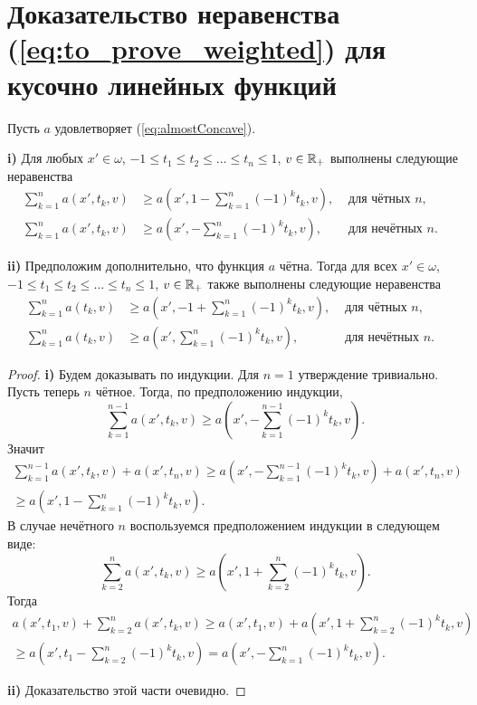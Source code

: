\section{Доказательство неравенства (\ref{eq:to_prove_weighted}) для кусочно ли\-ней\-ных функций}

\begin{lm}
\label{lm:weight_sum}
Пусть $a$ удовлетворяет (\ref{eq:almostConcave}).

\textbf{\textup{i)}}
Для любых $x' \in \omega$, $-1 \le t_1 \le t_2 \le \ldots \le t_n \le 1$, $v \in \mathbb R_+$ выполнены следующие неравенства
\begin{align*}
\sum_{k = 1}^n a(x', t_k, v) & \ge a( x', 1 - \sum_{k = 1}^n (-1)^k t_k, v ), & \text{ для чётных $n$}, & \\
\sum_{k = 1}^n a(x', t_k, v) & \ge a( x', - \sum_{k = 1}^n (-1)^k t_k, v ),   & \text{ для нечётных $n$}. &
\end{align*}

\textbf{\textup{ii)}}
Предположим дополнительно, что функция $a$ чётна.
Тогда для всех $x' \in \omega$, $-1 \le t_1 \le t_2 \le \ldots \le t_n \le 1$, $v \in \mathbb R_+$ также выполнены следующие неравенства
\begin{align*}
\sum_{k = 1}^n a(t_k, v) & \ge a( x', -1 + \sum_{k = 1}^n (-1)^k t_k, v ), & \text{ для чётных $n$}, & \\
\sum_{k = 1}^n a(t_k, v) & \ge a( x', \sum_{k = 1}^n (-1)^k t_k, v ),      & \text{ для нечётных $n$}. &
\end{align*}
\end{lm}

\begin{proof}
\textbf{\textup{i)}}
Будем доказывать по индукции.
Для $n = 1$ утверждение тривиально.
Пусть теперь $n$ чётное.
Тогда, по предположению индукции,
$$
\sum_{k=1}^{n - 1} a(x', t_k, v) \ge a( x', -\sum_{k = 1}^{n - 1} (-1)^k t_k, v ).
$$
Значит
\begin{multline*}
\sum_{k = 1}^{n - 1} a( x', t_k, v ) + a( x', t_n, v )
\ge a( x', -\sum_{k = 1}^{n - 1} (-1)^k t_k, v ) + a( x', t_n, v )
\\ \ge a( x', 1 - \sum_{k = 1}^{n} (-1)^k t_k, v ).
\end{multline*}
В случае нечётного $n$ воспользуемся предположением индукции в следующем виде:
$$
\sum_{k=2}^n a(x', t_k, v) \ge a( x', 1 + \sum_{k = 2}^n (-1)^k t_k, v ).
$$
Тогда
\begin{multline*}
a( x', t_1, v ) + \sum_{k = 2}^n a( x', t_k, v )
\ge a( x', t_1, v ) + a( x', 1 + \sum_{k = 2}^{n} (-1)^k t_k, v )
\\ \ge a( x', t_1 - \sum_{k = 2}^{n} (-1)^k t_k, v ) = a( x', -\sum_{k = 1}^{n} (-1)^k t_k, v ).
\end{multline*}

\textbf{\textup{ii)}} Доказательство этой части очевидно.
\end{proof}

